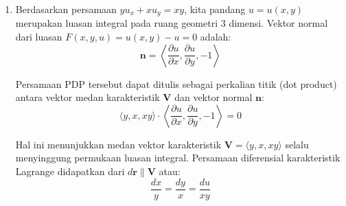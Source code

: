 \documentclass{article}
\theoremstyle{definition}
\begin{document}
\begin{enumerate}
\begin{enumerate}
                Cara lain yaitu substitusikan $y = 0$ ke dalam penyelesaian umum awal:
                $$u(x,0) = -\frac{1}{2}x - \frac{1}{4} + f(0)e^{2x}$$

                Berdasarkan syarat batas $u(x,0) = \frac{3}{4} - \frac{x}{2}$, kita peroleh:
                $$-\frac{1}{2}x - \frac{1}{4} + f(0)e^{2x} = \frac{3}{4} - \frac{1}{2}x$$

                Tambahkan $\frac{1}{2}x$ di kedua ruas:
                $$-\frac{1}{4} + f(0)e^{2x} = \frac{3}{4}$$

                Pindahkan konstanta:
                $$f(0)e^{2x} = \frac{3}{4} + \frac{1}{4}$$
                $$f(0)e^{2x} = 1$$

                Karena $y=0$, maka $f(0)$ adalah sebuah nilai konstanta (misalkan $C$). Persamaan menjadi:
                $$C e^{2x} = 1 \implies e^{2x} = \frac{1}{C}$$

                Persamaan ini menyatakan bahwa fungsi eksponensial $e^{2x}$ sama dengan sebuah nilai konstanta mutlak ($\frac{1}{C}$) untuk semua nilai $x$. Ini merupakan sebuah kontradiksi matematis karena $e^{2x}$ adalah fungsi yang nilainya berubah bergantung pada $x$, bukan sebuah garis lurus konstan. Karena tidak ada nilai konstanta $f(0)$ yang dapat memenuhi persamaan tersebut untuk setiap $x$, maka dapat disimpulkan bahwa PDP dengan syarat batas tersebut tidak mempunyai penyelesaian.
        \end{enumerate}
  \item Berdasarkan persamaan \( y u_x + x u_y = xy \), kita pandang \( u = u(x,y) \) merupakan luasan integral pada ruang geometri 3 dimensi. Vektor normal dari luasan \( F(x,y,u) = u(x,y) - u = 0 \) adalah:
        \[
          \mathbf{n} = \left\langle \frac{\partial u}{\partial x}, \frac{\partial u}{\partial y}, -1 \right\rangle
        \]

        Persamaan PDP tersebut dapat ditulis sebagai perkalian titik (dot product) antara vektor medan karakteristik \(\mathbf{V}\) dan vektor normal \(\mathbf{n}\):
        \[
          \langle y, x, xy \rangle \cdot \left\langle \frac{\partial u}{\partial x}, \frac{\partial u}{\partial y}, -1 \right\rangle = 0
        \]

        Hal ini menunjukkan medan vektor karakteristik \(\mathbf{V} = \langle y, x, xy \rangle\) selalu menyinggung permukaan luasan integral. Persamaan diferensial karakteristik Lagrange didapatkan dari \( d\mathbf{r} \parallel \mathbf{V} \) atau:
        \[
          \frac{dx}{y} = \frac{dy}{x} = \frac{du}{xy}
        \]


\end{enumerate}
\end{document}
